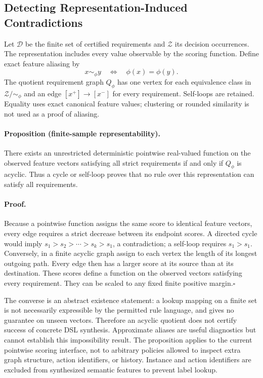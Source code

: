 \subsection{Detecting Representation-Induced Contradictions}
\label{sec:method:alias}

Let $\mathcal{D}$ be the finite set of certified requirements and
$\mathcal{Z}$ its decision occurrences. The representation includes every
value observable by the scoring function. Define exact feature aliasing by
\begin{equation}
 x\sim_\phi y\quad\Longleftrightarrow\quad \phi(x)=\phi(y).
\end{equation}
The quotient requirement graph $Q_\phi$ has one vertex for each equivalence
class in $\mathcal{Z}/\!\sim_\phi$ and an edge
$[x^+]\rightarrow[x^-]$ for every requirement. Self-loops are retained.
Equality uses exact canonical feature values; clustering or rounded
similarity is not used as a proof of aliasing.

\paragraph{Proposition (finite-sample representability).}
There exists an unrestricted deterministic pointwise real-valued function
on the observed feature vectors satisfying all strict requirements if and
only if $Q_\phi$ is acyclic. Thus a cycle or self-loop proves that no rule
over this representation can satisfy all requirements.

\paragraph{Proof.}
Because a pointwise function assigns the same score to identical feature
vectors, every edge requires a strict decrease between its endpoint
scores. A directed cycle would imply
$s_1>s_2>\cdots>s_k>s_1$, a contradiction; a self-loop requires
$s_1>s_1$. Conversely, in a finite acyclic graph assign to each vertex the
length of its longest outgoing path. Every edge then has a larger score at
its source than at its destination. These scores define a function on the
observed vectors satisfying every requirement. They can be scaled to any
fixed finite positive margin.\hfill$\square$

The converse is an abstract existence statement: a lookup mapping on a
finite set is not necessarily expressible by the permitted rule language,
and gives no guarantee on unseen vectors. Therefore an acyclic quotient
does not certify success of concrete DSL synthesis. Approximate aliases
are useful diagnostics but cannot establish this impossibility result.
The proposition applies to the current pointwise scoring interface, not
to arbitrary policies allowed to inspect extra graph structure, action
identifiers, or history. Instance and action identifiers are excluded from
synthesized semantic features to prevent label lookup.

